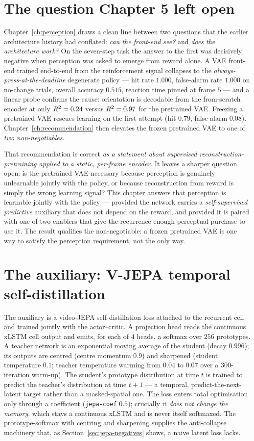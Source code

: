 \section{The question Chapter 5 left open}
Chapter~\ref{ch:perception} draws a clean line between two questions that the earlier
architecture history had conflated: \emph{can the front-end see?} and \emph{does the
architecture work?} On the seven-step task the answer to the first was decisively negative
when perception was asked to emerge from reward alone. A VAE front-end trained end-to-end
from the reinforcement signal collapses to the \emph{always-press-at-the-deadline}
degenerate policy --- hit rate $1.000$, false-alarm rate $1.000$ on no-change trials,
overall accuracy $0.515$, reaction time pinned at frame $5$ --- and a linear probe confirms
the cause: orientation is decodable from the from-scratch encoder at only $R^{2}=0.24$ versus
$R^{2}=0.97$ for the pretrained VAE. Freezing a pretrained VAE rescues learning on the first
attempt (hit $0.79$, false-alarm $0.08$). Chapter~\ref{ch:recommendation} then elevates the
frozen pretrained VAE to one of \emph{two non-negotiables}.

That recommendation is correct \emph{as a statement about supervised reconstruction-
pretraining applied to a static, per-frame encoder}. It leaves a sharper question open: is
the pretrained VAE necessary because perception is genuinely unlearnable jointly with the
policy, or because reconstruction from reward is simply the wrong learning signal? This
chapter answers that perception is learnable jointly with the policy --- provided the
network carries a \emph{self-supervised predictive} auxiliary that does not depend on the
reward, and provided it is paired with one of two enablers that give the recurrence enough
perceptual purchase to use it. The result qualifies the non-negotiable: a frozen pretrained
VAE is one way to satisfy the perception requirement, not the only way.

\section{The auxiliary: V-JEPA temporal self-distillation}
The auxiliary is a video-JEPA self-distillation loss attached to the recurrent cell and
trained jointly with the actor--critic. A projection head reads the continuous xLSTM cell
output and emits, for each of $4$ heads, a softmax over $256$ prototypes. A teacher network
is an exponential moving average of the student (decay $0.996$); its outputs are centred
(centre momentum $0.9$) and sharpened (student temperature $0.1$; teacher temperature
warming from $0.04$ to $0.07$ over a $300$-iteration warm-up). The student's prototype
distribution at time $t$ is trained to predict the teacher's distribution at time $t{+}1$
--- a temporal, predict-the-next-latent target rather than a masked-spatial one. The loss
enters total optimisation only through a coefficient (\texttt{jepa-coef} $0.5$); crucially
it \emph{does not change the memory}, which stays a continuous xLSTM and is never itself
softmaxed. The prototype-softmax with centring and sharpening supplies the anti-collapse
machinery that, as Section~\ref{sec:jepa-negatives} shows, a naive latent loss lacks.

